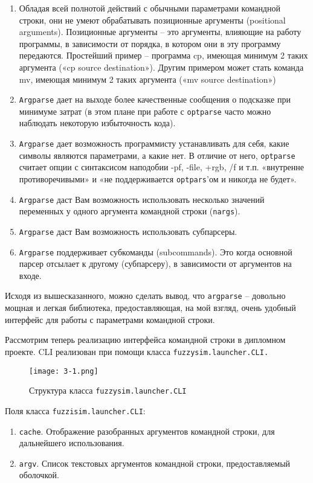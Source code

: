 \begin{enumerate}[label=\arabic*)]
	\item Обладая всей полнотой действий с обычными параметрами командной строки, они не умеют обрабатывать позиционные аргументы (positional arguments). Позиционные аргументы – это аргументы, влияющие на работу программы, в зависимости от порядка, в котором они в эту программу передаются. Простейший пример – программа cp, имеющая минимум 2 таких аргумента («cp source destination»). Другим примером может стать команда  mv, имеющая минимум 2 таких аргумента («mv source destination»)
	\item \lstinline!Argparse! дает на выходе более качественные сообщения о подсказке при минимуме затрат (в этом плане при работе с \lstinline!optparse! часто можно наблюдать некоторую избыточность кода).
	\item \lstinline!Argparse! дает возможность программисту устанавливать для себя, какие символы являются параметрами, а какие нет. В отличие от него, \lstinline!optparse! считает опции с синтаксисом наподобии -pf, -file, +rgb, /f и т.п. «внутренне противоречивыми» и «не поддерживается \lstinline!optpars!'ом и никогда не будет».
	\item \lstinline!Argparse! даст Вам возможность использовать несколько значений переменных у одного аргумента командной строки (\lstinline!nargs!).
	\item \lstinline!Argparse! даст Вам возможность использовать субпарсеры.
	\item \lstinline!Argparse! поддерживает субкоманды (subcommands). Это когда основной парсер отсылает к другому (субпарсеру), в зависимости от аргументов на входе.
\end{enumerate}

Исходя из вышесказанного, можно сделать вывод, что \lstinline!argparse! – довольно мощная и легкая библиотека, предоставляющая, на мой взгляд, очень удобный интерфейс для работы с параметрами командной строки.

Рассмотрим теперь реализацию интерфейса командной строки в дипломном проекте. CLI реализован при помощи класса \lstinline!fuzzysim.launcher.CLI.!

\begin{figure}[ht]
  \centering
  \texttt{[image: 3-1.png]}
  \caption{ Структура класса \lstinline!fuzzysim.launcher.CLI! }
  \label{fig:func:1}
\end{figure}

Поля класса \lstinline!fuzzisim.launcher.CLI!:
\begin{enumerate}[label=\arabic*)]
  \item \lstinline!cache!. Отображение разобранных аргументов командной строки, для дальнейшего использования.
  \item \lstinline!argv!. Список текстовых аргументов командной строки, предоставляемый оболочкой.
\end{enumerate}

